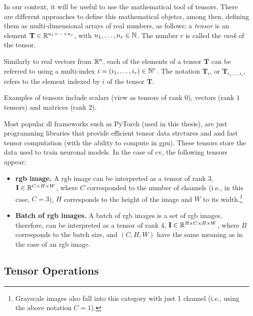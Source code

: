 In our context, it will be useful to use the mathematical tool of
tensors. There are different approaches to define this mathematical objetcs,
among then, defining them as multi-dimensional arrays of real numbers, as
follows: a \emph{tensor} is an element
\(\mathbf{T} \in \mathbb{R}^{n_1 \times \cdots \times n_r}\), with
\(n_1, \ldots, n_r \in \mathbb{N}\). The number \(r\) is called the \emph{rank} of the
tensor.

Similarly to real vectors from \(\mathbb{R}^n\), each of the elements of a tensor
\(\mathbf{T}\) can be referred to using a multi-index
\(i = (i_1, \ldots, i_r) \in \mathbb{N}^r\). The notation \(\mathbf{T}_i\), or
\(\mathbf{T}_{i_1, \ldots, i_r}\), refers to the element indexed by \(i\) of
the tensor \(\mathbf{T}\).

\begin{exampleBox}
  Examples of tensors include scalars (view as tensors of rank \(0\)), vectors
  (rank \(1\) tensors) and matrices (rank \(2\)).
\end{exampleBox}

Most popular \gls{dl} frameworks such as PyTorch (used in this thesis), are
just programming libraries that provide efficient tensor data strctures and and
fast tensor computation (with the ability to compute in \gls{gpu}). These
tensors store the data used to train neuronal models. In the case of \gls{cv},
the following tensors appear:
\begin{itemize}
  \item \textbf{\acs{rgb} image.} A \acs{rgb} image can be interpreted as a
  tensor of rank 3, \(\mathbf{I} \in \mathbb{R}^{C \times H \times W}\), where \(C\)
  corresponded to the number of channels (i.e., in this case, \(C = 3\)), \(H\)
  corresponds to the height of the image and \(W\) to its
  width.\footnote{Grayscale images also fall into this category with just 1
    channel (i.e., using the above notation \(C = 1\)).}
  \item \textbf{Batch of \acs{rgb} images.} A batch of \acs{rgb} images is a
  set of \acs{rgb} images, therefore, can be interpreted as a tensor of rank 4,
  \(\mathbf{I} \in \mathbb{R}^{B \times C \times H \times W}\), where \(B\) corresponds
  to the batch size, and \((C, H, W)\) have the same meaning as in the case of
  an \acs{rgb} image.
\end{itemize}


\subsection{Tensor Operations}

